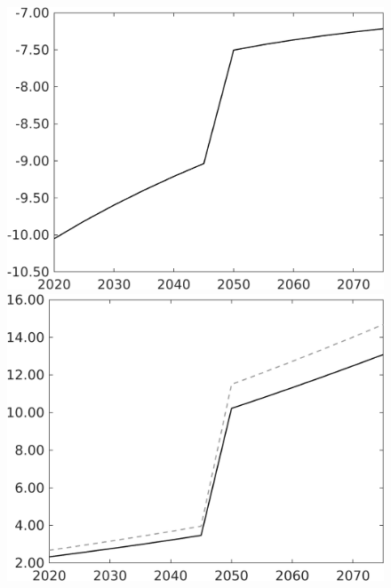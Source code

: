 \begin{figure}[h!!]
\begin{minipage}[]{0.32\textwidth}
 	\includegraphics[width=1\textwidth]{../../codding_model/own_basedOnFried/optimalPol_010922_revision/figures/all_13Sept22/CompTaufPER_bytaul_Reg0_Tauf_spillover0_nsk0_xgr0_knspil0_sep0_LFlimit1_emsbase0_countec0_GovRev0_etaa0.79_lgd0.png} \end{minipage}		
\begin{minipage}[]{0.32\textwidth}
\includegraphics[width=1\textwidth]{../../codding_model/own_basedOnFried/optimalPol_010922_revision/figures/all_13Sept22/CompTauf_bytaul_Reg0_GFF_spillover0_nsk0_xgr0_knspil0_sep0_LFlimit1_emsbase0_countec0_GovRev0_etaa0.79_lgd0.png}

\end{minipage}
\end{figure}
